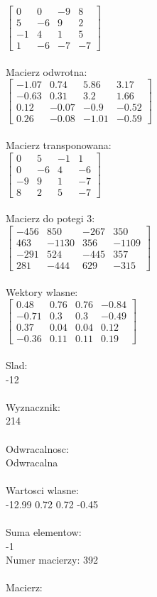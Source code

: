 \documentclass[a4paper,12pt]{article}
\begin{document}
$\begin{bmatrix} 0&0&-9&8\\5&-6&9&2\\-1&4&1&5\\1&-6&-7&-7 \end{bmatrix}$
\\
\\
Macierz odwrotna:\\

$\begin{bmatrix} -1.07&0.74&5.86&3.17\\-0.63&0.31&3.2&1.66\\0.12&-0.07&-0.9&-0.52\\0.26&-0.08&-1.01&-0.59 \end{bmatrix}$
\\
\\
Macierz transponowana:\\

$\begin{bmatrix} 0&5&-1&1\\0&-6&4&-6\\-9&9&1&-7\\8&2&5&-7 \end{bmatrix}$
\\
\\
Macierz do potegi 3:\\

$\begin{bmatrix} -456&850&-267&350\\463&-1130&356&-1109\\-291&524&-445&357\\281&-444&629&-315 \end{bmatrix}$
\\
\\
Wektory wlasne:\\

$\begin{bmatrix} 0.48&0.76&0.76&-0.84\\-0.71&0.3&0.3&-0.49\\0.37&0.04&0.04&0.12\\-0.36&0.11&0.11&0.19 \end{bmatrix}$
\\
\\
Slad:\\
-12
\\
\\
Wyznacznik:\\
214
\\
\\
Odwracalnosc:\\
Odwracalna
\\
\\
Wartosci wlasne:\\
-12.99 0.72 0.72 -0.45
\\
\\
Suma elementow:\\
-1
\\
\newpage
Numer macierzy:
392
\\
\\
Macierz:\\
\end{document}
